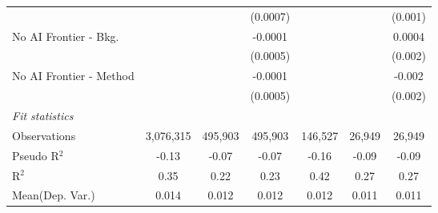 \begin{tabular}{lcccccc}
                           &               &               & (0.0007)      &              &          & (0.001)\\   
   No AI Frontier - Bkg.   &               &               & -0.0001       &              &          & 0.0004\\   
                           &               &               & (0.0005)      &              &          & (0.002)\\   
   No AI Frontier - Method &               &               & -0.0001       &              &          & -0.002\\   
                           &               &               & (0.0005)      &              &          & (0.002)\\   
   \midrule
   \emph{Fit statistics}\\
   Observations            & 3,076,315     & 495,903       & 495,903       & 146,527      & 26,949   & 26,949\\  
   Pseudo R$^2$            & -0.13         & -0.07         & -0.07         & -0.16        & -0.09    & -0.09\\  
   R$^2$                   & 0.35          & 0.22          & 0.23          & 0.42         & 0.27     & 0.27\\  
Mean(Dep. Var.) & 0.014 & 0.012 & 0.012 & 0.012 & 0.011 & 0.011 \\
   

\end{tabular}
